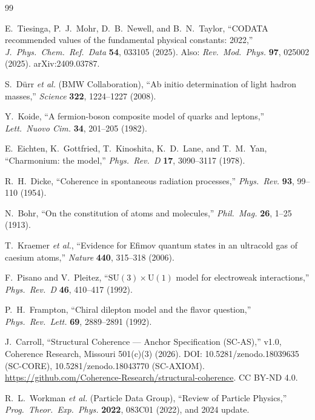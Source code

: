 \documentclass[12pt,a4paper]{article}
\theoremstyle{definition}
\begin{document}
\begin{thebibliography}{99}

E.~Tiesinga, P.~J.~Mohr, D.~B.~Newell, and B.~N.~Taylor,
``CODATA recommended values of the fundamental physical constants: 2022,''
\textit{J.\ Phys.\ Chem.\ Ref.\ Data} \textbf{54}, 033105 (2025).
Also: \textit{Rev.\ Mod.\ Phys.} \textbf{97}, 025002 (2025).
arXiv:2409.03787.

S.~D\"urr \textit{et al.} (BMW Collaboration),
``Ab initio determination of light hadron masses,''
\textit{Science} \textbf{322}, 1224--1227 (2008).

Y.~Koide,
``A fermion-boson composite model of quarks and leptons,''
\textit{Lett.\ Nuovo Cim.} \textbf{34}, 201--205 (1982).

E.~Eichten, K.~Gottfried, T.~Kinoshita, K.~D.~Lane, and T.~M.~Yan,
``Charmonium: the model,''
\textit{Phys.\ Rev.\ D} \textbf{17}, 3090--3117 (1978).

R.~H.~Dicke,
``Coherence in spontaneous radiation processes,''
\textit{Phys.\ Rev.} \textbf{93}, 99--110 (1954).

N.~Bohr,
``On the constitution of atoms and molecules,''
\textit{Phil.\ Mag.} \textbf{26}, 1--25 (1913).

T.~Kraemer \textit{et al.},
``Evidence for Efimov quantum states in an ultracold gas of caesium atoms,''
\textit{Nature} \textbf{440}, 315--318 (2006).

F.~Pisano and V.~Pleitez,
``$\mathrm{SU}(3) \times \mathrm{U}(1)$ model for electroweak interactions,''
\textit{Phys.\ Rev.\ D} \textbf{46}, 410--417 (1992).

P.~H.~Frampton,
``Chiral dilepton model and the flavor question,''
\textit{Phys.\ Rev.\ Lett.} \textbf{69}, 2889--2891 (1992).

J.~Carroll,
``Structural Coherence --- Anchor Specification (SC-AS),'' v1.0,
Coherence Research, Missouri 501(c)(3) (2026).
DOI: 10.5281/zenodo.18039635 (SC-CORE), 10.5281/zenodo.18043770 (SC-AXIOM).
\url{https://github.com/Coherence-Research/structural-coherence}.
CC BY-ND 4.0.

R.~L.~Workman \textit{et al.} (Particle Data Group),
``Review of Particle Physics,''
\textit{Prog.\ Theor.\ Exp.\ Phys.} \textbf{2022}, 083C01 (2022),
and 2024 update.


\end{thebibliography}
\end{document}
